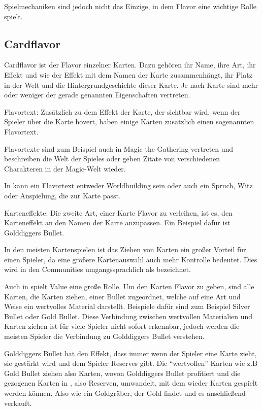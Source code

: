 Spielmechaniken sind jedoch nicht das Einzige, in dem Flavor eine wichtige Rolle spielt.

\subsection{Cardflavor}\label{subsec:cardflavor}

Cardflavor ist der Flavor einzelner Karten.
Dazu gehören ihr Name, ihre Art, ihr Effekt und wie der Effekt mit dem Namen der Karte zusammenhängt,
ihr Platz in der Welt und die Hintergrundgeschichte dieser Karte. Je nach Karte sind mehr oder weniger der gerade genannten
Eigenschaften vertreten.


Flavortext:
Zusätzlich zu dem Effekt der Karte, der sichtbar wird, wenn der Spieler über die Karte hovert, haben einige Karten zusätzlich einen sogenannten Flavortext.


Flavortexte sind zum Beispiel auch in Magic the Gathering vertreten und beschreiben die Welt der Spieles oder geben
Zitate von verschiedenen Charakteren in der Magic-Welt wieder. %


In \FF kann ein Flavortext entweder Worldbuilding sein oder auch ein Spruch, Witz oder Anspielung, die zur Karte passt.


Karteneffekte:
Die zweite Art, einer Karte Flavor zu verleihen, ist es, den Karteneffekt an den Namen der Karte anzupassen.
Ein Beispiel dafür ist Golddiggers Bullet.


In den meisten Kartenspielen ist das Ziehen von Karten ein großer Vorteil für einen Spieler, da eine größere Kartenauswahl
auch mehr Kontrolle bedeutet. Dies wird in den Communities umgangssprachlich als  bezeichnet. 


Auch in \FF spielt Value eine große Rolle.
Um den Karten Flavor zu geben, sind alle Karten, die Karten ziehen, einer Bullet zugeordnet, welche auf eine Art und Weise ein wertvolles Material darstellt.
Beispiele dafür sind zum Beispiel Silver Bullet oder Gold Bullet. Diese Verbindung zwischen wertvollen
Materialien und Karten ziehen ist für viele Spieler nicht sofort erkennbar, jedoch werden die meisten Spieler die Verbindung zu Golddiggers Bullet verstehen.


Golddiggers Bullet hat den Effekt, dass immer wenn der Spieler eine Karte zieht, sie gestärkt wird und dem Spieler Reserves gibt. Die “wertvollen” Karten wie z.B Gold Bullet ziehen also Karten, wovon Golddiggers Bullet profitiert und die
gezogenen Karten in , also Reserven, umwandelt, mit dem wieder Karten gespielt werden können. Also wie ein Goldgräber, der Gold findet und es anschließend verkauft.

